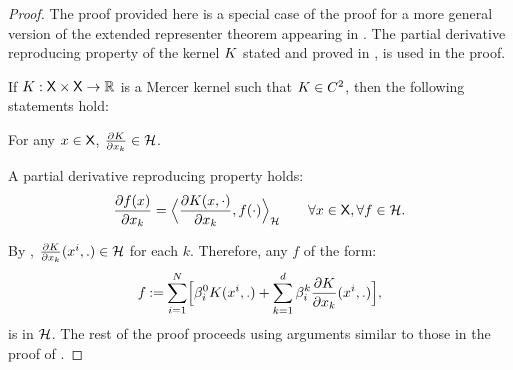 \begin{proof}
 The proof provided here is a special case of the proof for a more general version of the extended representer theorem appearing in \cite{zho08}. The partial derivative reproducing property of the kernel $K$ stated and proved in \cite[Theorem 1]{zho08}, is used in the proof.  
 \begin{lemma}
 If $K :{\sf X} \times {\sf X} \to \mathbb{R}$ is a Mercer kernel such that $K \in C^2$, then the following statements hold:
 \begin{romannum}
 \item For any $x \in {\sf X}$, $\frac{\partial K}{\partial x_k} \in {\cal H}$. 
 \item A partial derivative reproducing property holds:
 \begin{equation}
 \frac{\partial f(x)}{\partial x_k} = \Bigl \langle \frac{\partial K(x, \cdot)}{\partial x_k} , f(\cdot) \Bigr \rangle_{\cal H} \qquad \forall x \in {\sf X}, \forall f \in {\cal H}.
 \end{equation}
 \end{romannum}
 \label{lemma:der_rep_property}
 \end{lemma}
 By , $\frac{\partial K}{\partial x_k}(x^i,.) \in {\cal H}$ for each $k$.
Therefore, any $f$ of the form:
	\[
	f \mathbin{:=}  \sum_{i=1}^N  \Bigl[
	\beta_i^{0}  K(x^i, .)   +  \sum_{k =1}^d  \beta_i^{k} \frac{\partial K}{\partial x_k}  (x^i, .) \Bigr],
	\]
	is in ${\cal H}$. The rest of the proof proceeds using arguments similar to those in the proof of . 


\end{proof}
